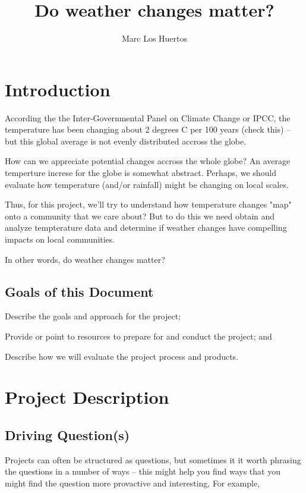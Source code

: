 \documentclass{article}\usepackage[]{graphicx}\usepackage[]{color}
\title{Do weather changes matter?}
\author{Marc Los Huertos}
\newenvironment{enumerate*}%
  {\begin{enumerate}%
    \setlength{\itemsep}{0pt}%
    \setlength{\parskip}{0pt}}%
  {\end{enumerate}}
\begin{document}
\maketitle

\section{Introduction}

According the the Inter-Governmental Panel on Climate Change or IPCC, the temperature has been changing about 2 degrees C per 100 years (check this) -- but this global average is not evenly distributed accross the globe. 

How can we appreciate potential changes accross the whole globe? An average temperture increse for the globe is somewhat abstract.   Perhaps, we should evaluate how temperature (and/or rainfall) might be changing on local scales. 

Thus, for this project, we'll try to understand how temperature changes "map" onto a community that we care about? But to do this we need obtain and analyze tempterature data and determine if weather changes have compelling impacts on local communities.

In other words, do weather changes matter?

\subsection{Goals of this Document}

\begin{enumerate*}
  \item Describe the goals and approach for the project;
  \item Provide or point to resources to prepare for and conduct the project; and
  \item Describe how we will evaluate the project process and products.
\end{enumerate*}

\section{Project Description}

\subsection{Driving Question(s)}

Projects can often be structured as questions, but sometimes it it worth phrasing the questions in a number of ways -- this might help you find ways that you might find the question more provactive and interesting, For example,
\end{document}
